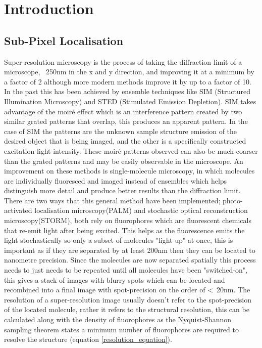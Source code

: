 \documentclass[aps,pra,a4paper,nofootinbib,onecolumn,tightenlines,longbibliography,12pt,amsfonts,amssymb,amsmath,floatfix]{revtex4-2} %
\begin{document}
\section{Introduction}
\label{sec:intro}
  \subsection{Sub-Pixel Localisation} %
  \label{sub:spot-finding intro}
  
  Super-resolution microscopy is the process of taking the diffraction limit 
  of a microscope, ~250nm in the x and y direction, and improving it at a minimum by a 
  factor of 2 although more modern methods improve it by up to a factor of 10. In the past this has been achieved by ensemble techniques
  like SIM (Structured Illumination Microscopy) and STED (Stimulated Emission Depletion).
  SIM takes advantage of the moir\'{e} effect which is an interference pattern created by two similar 
  grated patterns that overlap, this produces an apparent pattern. In the case of SIM the patterns are 
  the unknown sample structure emission of the desired object that is being imaged, and the other is 
  a specifically constructed excitation light intensity. These moir\'{e} patterns observed can also be
  much coarser than the grated patterns and may be easily observable in the microscope. \cite{gustafsson2000surpassing}
  An improvement on these methods 
  is single-molecule microscopy, in which molecules are individually fluoresced and 
  imaged instead of ensembles which helps distinguish more detail and produce better
  results than the diffraction limit.
  There are two ways that this general method have been implemented; photo-activated localisation
  microscopy(PALM) and stochastic optical reconstruction microscopy(STORM), both
  rely on fluorophores which are fluorescent chemicals that re-emit light after
  being excited. This helps as the fluorescence emits the light 
  stochastically so only a subset of molecules "light-up" at once, this is important 
  as if they are separated by at least 200nm then they can be located to nanometre precision. 
  Since the molecules are now separated spatially this process needs to just needs to be repeated 
  until all molecules have been "switched-on", this gives a stack of images with blurry spots
  which can be located and recombined into a final image with spot-precision on the order of <~20nm.\cite{galbraith2011super}
  The resolution of a super-resolution image usually doesn't refer to the spot-precision of the 
  located molecule, rather it refers to the structural resolution, this can be calculated along 
  with the density of fluorophores as the Nyquist-Shannon sampling theorem states a minimum number 
  of fluorophores are required to resolve the structure (equation \ref{resolution_equation}). \cite{van2011single}\cite{shannon1949communication}
\end{document}
